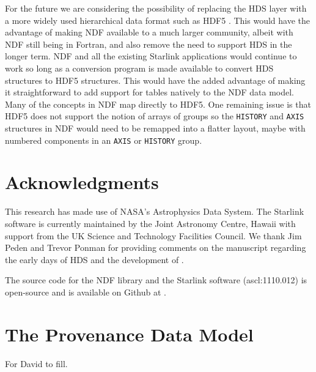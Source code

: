 \documentclass[final,authoryear,5p,times,twocolumn]{elsarticle}
\begin{document}
For the future we are considering the possibility of replacing the HDS
layer with a more widely used hierarchical data format such as HDF5
\citep{Folk:2011:OHT:1966895.1966900}. This would have the advantage
of making NDF available to a much larger community, albeit with NDF
still being in Fortran, and also remove the
need to support HDS in the longer term. NDF and all the existing
Starlink applications would continue to work so long as a conversion
program is made available to convert HDS structures to HDF5 structures.
This would have the added advantage of making it straightforward to
add support for tables natively to the NDF data model. Many of the
concepts in NDF map directly to HDF5. One remaining issue is that HDF5
does not support the notion of arrays of groups so the
\texttt{HISTORY} and \texttt{AXIS} structures in NDF would need to be
remapped into a flatter layout, maybe with numbered components in an
\texttt{AXIS} or \texttt{HISTORY} group.

\section{Acknowledgments}

This research has made use of NASA's Astrophysics Data System.
The Starlink software is currently maintained by the Joint Astronomy
Centre, Hawaii with support from the UK Science and Technology
Facilities Council. We thank Jim Peden and Trevor Ponman for providing
comments on the manuscript regarding the early days of HDS and the
development of \asterix.

The source code for the NDF library and the Starlink software
(ascl:1110.012) is open-source and is available on Github at
.


\appendix

\section{The Provenance Data Model}
\label{app:prov}

{\color{red} For David to fill.}
\end{document}
